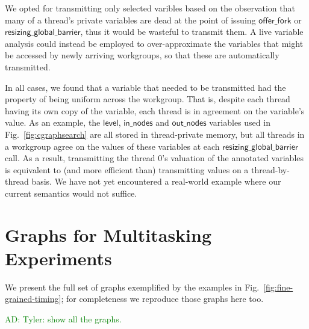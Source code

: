 \documentclass[numbers,nocopyrightspace,10pt]{sigplanconf}
\newcommand{\ADComment}[1]{\textcolor{green}{AD: #1}}
\newcommand{\myfig}{Fig.~}
\newcommand{\offerfork}{\mathsf{offer\_fork}}
\newcommand{\resizingglobalbarrier}{\mathsf{resizing\_global\_barrier}}
\newcommand{\keyword}[1]{\mathsf{#1}}
\begin{document}
We opted for transmitting only selected varibles based on the
observation that many of a thread's private variables are dead at the
point of issuing $\offerfork$ or $\resizingglobalbarrier$, thus it
would be wasteful to transmit them.  A live variable analysis could
instead be employed to over-approximate the variables that might be
accessed by newly arriving workgroups, so that these are automatically
transmitted.

In all cases, we found that a variable that needed to be transmitted
had the property of being uniform across the workgroup.  That is,
despite each thread having its own copy of the variable, each thread
is in agreement on the variable's value.  As an example, the
$\keyword{level}$, $\keyword{in\_nodes}$ and $\keyword{out\_nodes}$
variables used in \myfig\ref{fig:cgraphsearch} are all stored in thread-private
memory, but all threads in a workgroup agree on the values of these
variables at each $\resizingglobalbarrier$ call.  As a result,
transmitting the thread 0's valuation of the annotated variables is
equivalent to (and more efficient than) transmitting values on a
thread-by-thread basis.  We have not yet encountered a real-world
example where our current semantics would not suffice.


\section{Graphs for Multitasking Experiments}\label{appendix:extragraphs}

We present the full set of graphs exemplified by the examples in
\myfig\ref{fig:fine-grained-timing}; for completeness we reproduce those graphs here too.

\ADComment{Tyler: show all the graphs.}
\end{document}
